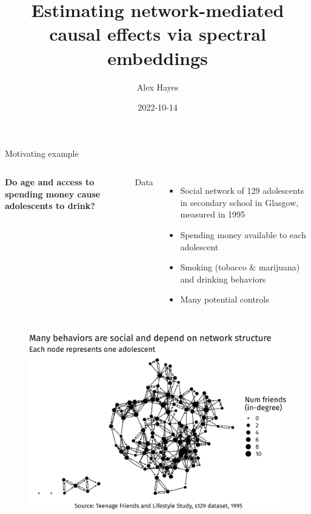 \documentclass{beamer}
\title{Estimating network-mediated causal effects via spectral embeddings}
\date{2022-10-14}
\author{Alex Hayes}
\institute{University of Wisconsin-Madison}
\theoremstyle{remark}
\begin{document}
\maketitle

\begin{frame}{Motivating example}

    \begin{columns}


        \textbf{Do age and access to spending money cause adolescents to drink?}


        Data

        \begin{itemize}
            \item Social network of 129 adolescents in secondary school in Glasgow, measured in 1995
            \item Spending money available to each adolescent
            \item Smoking (tobacco \& marijuana) and drinking behaviors
            \item Many potential controls
        \end{itemize}

    \end{columns}

\end{frame}

\begin{frame}
    \centering
    \vspace{3mm}
    \begin{figure}
        \includegraphics[width=\textwidth]{figures/glasgow-degree.png}
    \end{figure}

\end{frame}
\end{document}
